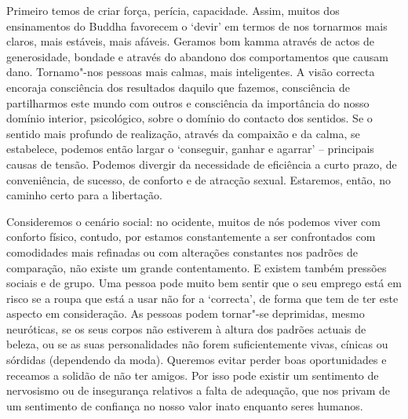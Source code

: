 Primeiro temos de criar força, perícia, capacidade. Assim, muitos dos
ensinamentos do Buddha favorecem o `devir' em termos de nos tornarmos mais
claros, mais estáveis, mais afáveis.
Geramos bom kamma através de actos de generosidade, bondade e através do abandono dos
comportamentos que causam dano. Tornamo"-nos pessoas mais calmas, mais
inteligentes. A visão correcta encoraja consciência dos resultados daquilo que
fazemos, consciência de partilharmos este mundo com outros e consciência da
importância do nosso domínio interior, psicológico, sobre o domínio do contacto
dos sentidos. Se o sentido mais profundo de realização, através da compaixão e
da calma, se estabelece, podemos então largar o `conseguir, ganhar e agarrar' --
principais causas de tensão. Podemos divergir da necessidade de eficiência a
curto prazo, de conveniência, de sucesso, de conforto e de atracção sexual.
Estaremos, então, no caminho certo para a libertação.

Consideremos o cenário social: no ocidente, muitos de nós podemos viver com
conforto físico, contudo, por estamos constantemente a ser confrontados com
comodidades mais refinadas ou com alterações constantes nos padrões de
comparação, não existe um grande contentamento. E existem também pressões
sociais e de grupo. Uma pessoa pode muito bem sentir que o seu emprego está em
risco se a roupa que está a usar não for a `correcta', de forma que tem de ter
este aspecto em consideração. As pessoas podem tornar"-se deprimidas, mesmo
neuróticas, se os seus corpos não estiverem à altura dos padrões actuais de
beleza, ou se as suas personalidades não forem suficientemente vivas, cínicas ou
sórdidas (dependendo da moda). Queremos evitar perder boas oportunidades e
receamos a solidão de não ter amigos. Por isso pode existir um sentimento de
nervosismo ou de insegurança relativos a falta de adequação, que nos privam de
um sentimento de confiança no nosso valor inato enquanto seres humanos.

